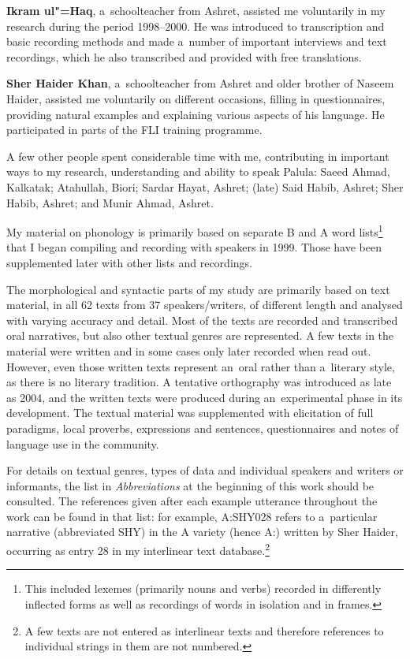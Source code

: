 \textbf{Ikram ul"=Haq}, a~schoolteacher from Ashret, assisted me voluntarily in my research during
the period 1998--2000. He was introduced to transcription and basic recording methods and made
a~number of important interviews and text recordings, which he also transcribed and provided with
free translations.


\textbf{Sher Haider Khan}, a~schoolteacher from Ashret and older brother of Naseem Haider, assisted me
voluntarily on different occasions, filling in questionnaires, providing natural examples and
explaining various aspects of his language. He participated in parts of the FLI training programme.


A few other people spent considerable time with me, contributing in important ways to my research,
understanding and ability to speak Palula: Saeed Ahmad, Kalkatak; Atahullah, Biori; Sardar
Hayat, Ashret; (late) Said Habib, Ashret; Sher Habib, Ashret; and Munir Ahmad, Ashret.


My material on phonology is primarily based on separate B and A word lists\footnote{This included
  lexemes (primarily nouns and verbs) recorded in differently inflected forms as well as recordings
  of words in isolation and in frames.} that I began compiling and recording with speakers in
1999. Those have been supplemented later with other lists and recordings.


The morphological and syntactic parts of my study are primarily based on text material, in all 62
texts from 37 speakers/writers, of different length and analysed with varying accuracy and
detail. Most of the texts are recorded and transcribed oral narratives, but also other textual
genres are represented. A few texts in the material were written and in some cases only later
recorded when read out. However, even those written texts represent an~oral rather than a~literary
style, as there is no literary tradition. A tentative orthography was introduced as late as 2004,
and the written texts were produced during an~experimental phase in its development. The textual
material was supplemented with elicitation of full paradigms, local proverbs, expressions and sentences,
questionnaires and notes of language use in the community.


For details on textual genres, types of data and individual speakers and writers or informants, the
list in \textit{Abbreviations} at the beginning of this work should be consulted. The references given after
each example utterance throughout the work can be found in that list: for example, A:SHY028 refers to
a~particular narrative (abbreviated SHY) in the A variety (hence A:) written by Sher Haider, occurring as entry 28 in my interlinear text database.\footnote{A few texts are not entered as interlinear texts and therefore references to individual strings in them are not numbered.}



